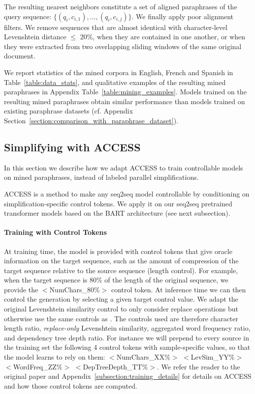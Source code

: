 \documentclass[11pt]{article}
\newcommand{\bart}{\textsc{BART}\xspace}
\newcommand{\access}{\mbox{\textsc{ACCESS}}\xspace}
\begin{document}
The resulting nearest neighbors constitute a set of aligned paraphrases of the query sequence: $\{(q_i, c_{i, 1}), \ldots, (q_i, c_{i, j})\}$.
We finally apply poor alignment filters. We remove sequences that are almost identical with character-level Levenshtein distance $\leq$ 20\%, when they are contained in one another, or when they were extracted from two overlapping sliding windows of the same original document.

We report statistics of the mined corpora in English, French and Spanish in Table~\ref{table:data_stats}, and qualitative examples of the resulting mined paraphrases in Appendix Table~\ref{table:mining_examples}.
Models trained on the resulting mined paraphrases obtain similar performance than models trained on existing paraphrase datasets (cf. Appendix Section~\ref{section:comparison_with_paraphrase_dataset}).



\subsection{Simplifying with \access} \label{subsection:access}
In this section we describe how we adapt \access \cite{martin2020controllable} to train controllable models on mined paraphrases, instead of labeled parallel simplifications.

\access is a method to make any seq2seq model controllable by conditioning on simplification-specific control tokens.
We apply it on our seq2seq pretrained transformer models based on the \bart \cite{lewis2019bart} architecture (see next subsection).

\paragraph{Training with Control Tokens} At training time, the model is provided with control tokens that give oracle information on the target sequence, such as the amount of compression of the target sequence relative to the source sequence (length control). For example, when the target sequence is 80\% of the length of the original sequence, we provide the $<$NumChars\_80\%$>$ control token. At inference time we can then control the generation by selecting a given target control value.
We adapt the original Levenshtein similarity control to only consider replace operations but otherwise use the same controls as \citet{martin2020controllable}.
The controls used are therefore character length ratio, \textit{replace-only} Levenshtein similarity, aggregated word frequency ratio, and dependency tree depth ratio.
For instance we will prepend to every source in the training set the following 4 control tokens with sample-specific values, so that the model learns to rely on them: $<$NumChars\_XX\%$>$
$<$LevSim\_YY\%$>$ $<$WordFreq\_ZZ\%$>$ $<$DepTreeDepth\_TT\%$>$.
We refer the reader to the original paper \cite{martin2020controllable} and Appendix~\ref{subsection:training_details} for details on \access and how those control tokens are computed.
\end{document}
